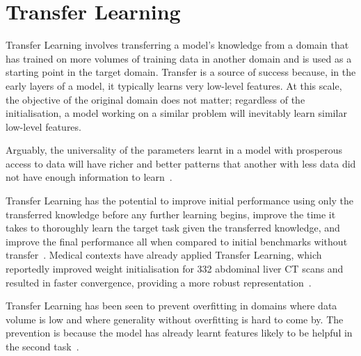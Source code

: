 \documentclass[12pt,twoside]{report}
\begin{document}
\section{Transfer Learning}

Transfer Learning involves transferring a model's knowledge from a domain that has trained on more volumes of training data in another domain and is used as a starting point in the target domain. Transfer is a source of success because, in the early layers of a model, it typically learns very low-level features. At 
this scale, the objective of the original domain does not matter; regardless of the initialisation, a model working on a similar problem will inevitably learn similar low-level features. 

Arguably, the universality of the parameters learnt in a model with prosperous access to data will have richer and better patterns that another with less data did not have enough information to learn~\cite{deep-learning-book, survey-on-transfer-learning}.

Transfer Learning has the potential to improve initial performance using only the transferred knowledge before any further learning begins, improve the time it takes to thoroughly learn the target task given the transferred knowledge, and improve the final performance all when compared to initial benchmarks without transfer~\cite{torrey-handbook}. Medical contexts have already applied Transfer Learning, which reportedly improved weight initialisation for 332 abdominal liver CT scans and resulted in faster convergence, providing a more robust representation~\cite{liver-lesion-via-transfer-learning}.

Transfer Learning has been seen to prevent overfitting in domains where data volume is low and where generality without overfitting is hard to come by. The prevention is because the model has already learnt features likely to be helpful in the second task~\cite{geeks-transfer-learning}. 

\end{document}
